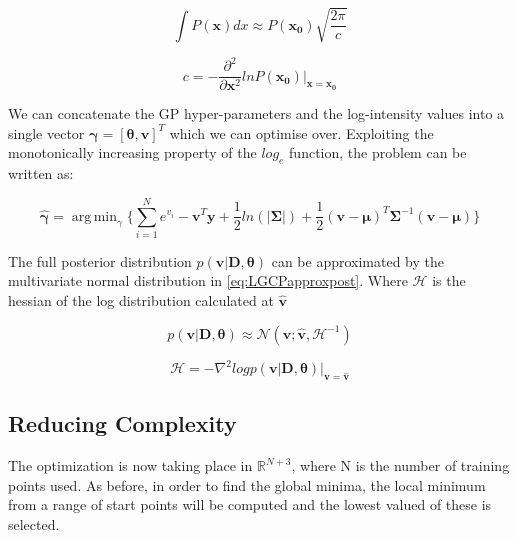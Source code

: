 \documentclass[a4paper,11pt]{report}
\DeclareMathOperator*{\argmin}{arg\,min}
\begin{document}
\singlespacing

\begin{equation} \label{eq:laplaceaprrox}
\int{P(\mathbf{x}) dx} \approx P(\mathbf{x_0}) \sqrt{\frac{2\pi}{c}}
\end{equation} 

\begin{equation} \label{eq:laplaceaprrox2}
c = - \frac{\partial^2}{\partial \mathbf{x}^2} ln P(\mathbf{x_0}) |_{\mathbf{x}=\mathbf{x_0}}
\end{equation}

\doublespacing 

We can concatenate the GP hyper-parameters and the log-intensity values into a single vector \( \boldsymbol{\gamma} = [\boldsymbol{\theta}, \mathbf{v}]^{T}\) which we can optimise over. Exploiting the monotonically increasing property of the \(log_e\) function, the problem can be written as:

\begin{equation} \label{eq:GPfmin}
\hat{\boldsymbol{\gamma}} = \argmin_\gamma{\{ \sum_{i=1}^{N}e^{v_i} - \mathbf{v}^{T}\mathbf{y} + \frac{1}{2}ln(|\boldsymbol{\Sigma}|) + \frac{1}{2}(\mathbf{v}-\boldsymbol{\mu})^{T}\boldsymbol{\Sigma}^{-1}(\mathbf{v}-\boldsymbol{\mu})\}}
\end{equation}

The full posterior distribution \(p(\mathbf{v|D},\boldsymbol{\theta})\) can be approximated by the multivariate normal distribution in \ref{eq:LGCPapproxpost}. Where \(\boldsymbol{\mathcal{H}}\) is the hessian of the log distribution calculated at \(\hat{\mathbf{v}}\) 

\singlespacing
\begin{equation} \label{eq:LGCPapproxpost}
p(\mathbf{v|D},\boldsymbol{\theta}) \approx \mathcal{N} (\mathbf{v}; \hat{\mathbf{v}}, \boldsymbol{\mathcal{H}}^{-1})
\end{equation}

\begin{equation}
\boldsymbol{\mathcal{H}} = -\nabla^2 log p(\mathbf{v|D},\boldsymbol{\theta}) |_{\mathbf{v}=\hat{\mathbf{v}}}
\end{equation}
\doublespacing

\subsection{Reducing Complexity}

The optimization is now taking place in \(\mathds{R}^{N+3}\), where N is the number of training points used. As before, in order to find the global minima, the local minimum from a range of start points will be computed and the lowest valued of these is selected.
\end{document}
